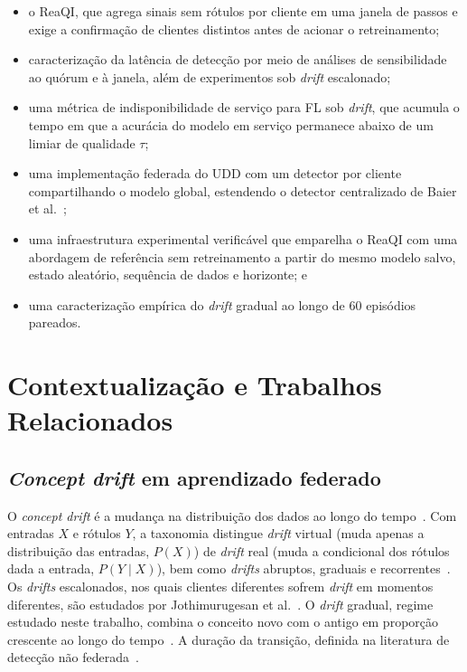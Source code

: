 \documentclass[conference]{IEEEtran}
\begin{document}
\begin{itemize}
    \item o ReaQI, que agrega sinais sem rótulos por cliente em uma janela de passos e exige a confirmação de clientes distintos antes de acionar o retreinamento;
    
    \item caracterização da latência de detecção por meio de análises de sensibilidade ao quórum e à janela, além de experimentos sob \textit{drift} escalonado; 
    
    \item uma métrica de indisponibilidade de serviço para FL sob \textit{drift}, que acumula o tempo em que a acurácia do modelo em serviço permanece abaixo de um limiar de qualidade $\tau$; 
    
    \item uma implementação federada do UDD com um detector por cliente compartilhando o modelo global, estendendo o detector centralizado de Baier et al.~\cite{baier2023}; 
    
    \item uma infraestrutura experimental verificável que emparelha o ReaQI com uma abordagem de referência sem retreinamento a partir do mesmo modelo salvo, estado aleatório, sequência de dados e horizonte; e 
    
    \item uma caracterização empírica do \textit{drift} gradual ao longo de 60 episódios pareados.
\end{itemize}


\section{Contextualização e Trabalhos Relacionados}


\subsection{\textit{Concept drift} em aprendizado federado}
O \textit{concept drift} é a mudança na distribuição dos dados ao longo do tempo~\cite{criado2022,mahdi2025}. Com entradas $X$ e rótulos $Y$, a taxonomia distingue \textit{drift} virtual (muda apenas a distribuição das entradas, $P(X)$) de \textit{drift} real (muda a condicional dos rótulos dada a entrada, $P(Y\mid X)$), bem como \textit{drifts} abruptos, graduais e recorrentes~\cite{mahdi2025}. Os \textit{drifts} escalonados, nos quais clientes diferentes sofrem \textit{drift} em momentos diferentes, são estudados por Jothimurugesan et al.~\cite{jothimurugesan2023}. O \textit{drift} gradual, regime estudado neste trabalho, combina o conceito novo com o antigo em proporção crescente ao longo do tempo~\cite{casado2022}. A duração da transição, definida na literatura de detecção não federada~\cite{poenaru2022,cerqueira2026}.
\end{document}
